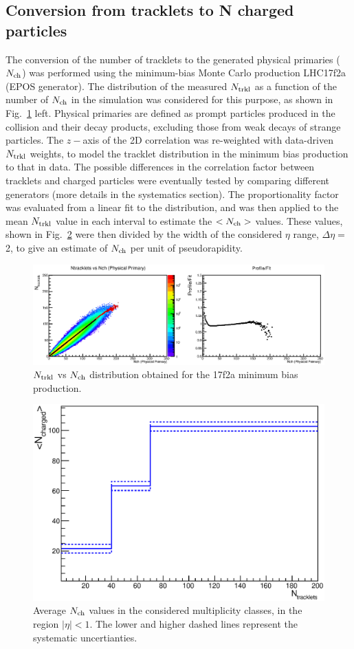 \subsection {Conversion from tracklets to N charged particles}
The conversion of the number of tracklets to the generated physical primaries ($N_{\rm ch}$) 
was performed using the minimum-bias Monte Carlo production LHC17f2a (EPOS generator). 
The distribution of the measured $N_{\rm trkl}$ as a function of the number of
$N_{\rm ch}$ in the simulation was considered for this purpose, as shown in Fig.~\ref{fig:NtrklVsNch} left.
Physical primaries are defined as prompt particles produced in the collision and their
decay products, excluding those from weak decays of strange particles. The $z-$axis of
the 2D correlation was re-weighted with data-driven $N_{\rm trkl}$ weights, to model the tracklet
distribution in the minimum bias production to that in data. The possible differences in the correlation
factor between tracklets and charged particles were eventually tested by comparing different generators (more details
in the systematics section). The proportionality factor was evaluated from a linear fit to the distribution, 
and was then applied to the mean $N_{\rm trkl}$ value in each interval to estimate the $<N_{\rm ch}>$ values. 
These values, shown in Fig.~\ref{fig:Nch} were then divided by the width of the considered $\eta$ range, $\Delta \eta =$ 2, 
to give an estimate of $N_{\rm ch}$ per unit of pseudorapidity.

\begin{figure}[h]
\centering
 \includegraphics[width=1.\textwidth]{FigCap6/NtrklVsNchPhysPrimWithNtrklsReweight17f2a.eps}
 \caption{$N_{\rm trkl}$ vs $N_{\rm ch}$ distribution obtained for the 17f2a minimum bias production.}
 \label{fig:NtrklVsNch}
\end{figure}

\begin{figure}[h]
\centering
 \includegraphics[width=.55\textwidth]{FigCap6/AverNchAndTotalSystUnc.eps}
 \caption{Average $N_{\rm ch}$ values in the considered multiplicity classes, in the region $|\eta |< 1$. The lower and higher dashed lines represent the systematic uncertianties.}
 \label{fig:Nch}
\end{figure}

